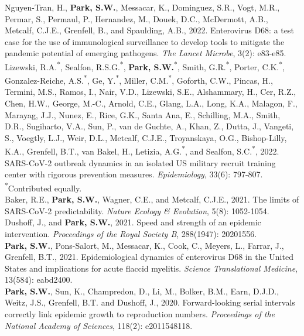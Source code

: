 \documentclass[11pt]{article} %
\begin{document}
 Nguyen-Tran, H., \textbf{Park, S.W.}, Messacar, K., Dominguez, S.R., Vogt, M.R., Permar, S., Permaul, P., Hernandez, M., Douek, D.C., McDermott, A.B., Metcalf, C.J.E., Grenfell, B., and Spaulding, A.B., 2022. Enterovirus D68: a test case for the use of immunological surveillance to develop tools to mitigate the pandemic potential of emerging pathogens. \textit{The Lancet Microbe}, 3(2): e83-e85.\\

 Lizewski, R.A.\textsuperscript{*}, Sealfon, R.S.G.\textsuperscript{*}, \textbf{Park, S.W.}\textsuperscript{*}, Smith, G.R.\textsuperscript{*}, Porter, C.K.\textsuperscript{*}, Gonzalez-Reiche, A.S.\textsuperscript{*}, Ge, Y.\textsuperscript{*}, Miller, C.M.\textsuperscript{*}, Goforth, C.W., Pincas, H., Termini, M.S., Ramos, I., Nair, V.D., Lizewski, S.E., Alshammary, H., Cer, R.Z., Chen, H.W., George, M.-C., Arnold, C.E., Glang, L.A., Long, K.A., Malagon, F., Marayag, J.J., Nunez, E., Rice, G.K., Santa Ana, E., Schilling, M.A., Smith, D.R., Sugiharto, V.A., Sun, P., van de Guchte, A., Khan, Z., Dutta, J., Vangeti, S., Voegtly, L.J., Weir, D.L., Metcalf, C.J.E., Troyanskaya, O.G., Bishop-Lilly, K.A., Grenfell, B.T., van Bakel, H., Letizia, A.G.\textsuperscript{*}, and Sealfon, S.C.\textsuperscript{*}, 2022. SARS-CoV-2 outbreak dynamics in an isolated US military recruit training center with rigorous prevention measures. \textit{Epidemiology}, 33(6): 797-807.\\
\textsuperscript{*}Contributed equally.\\

 Baker, R.E., \textbf{Park, S.W.}, Wagner, C.E., and Metcalf, C.J.E., 2021. The limits of SARS-CoV-2 predictability. \textit{Nature Ecology \& Evolution}, 5(8): 1052-1054.\\

 Dushoff, J., and \textbf{Park, S.W.}, 2021. Speed and strength of an epidemic intervention. \textit{Proceedings of the Royal Society B}, 288(1947): 20201556.\\

 \textbf{Park, S.W.}, Pons-Salort, M., Messacar, K., Cook, C., Meyers, L., Farrar, J., Grenfell, B.T., 2021. Epidemiological dynamics of enterovirus D68 in the United States and implications for acute flaccid myelitis. \textit{Science Translational Medicine}, 13(584): eabd2400.\\

 \textbf{Park, S.W.}, Sun, K., Champredon, D., Li, M., Bolker, B.M., Earn, D.J.D., Weitz, J.S., Grenfell, B.T. and Dushoff, J., 2020. Forward-looking serial intervals correctly link epidemic growth to reproduction numbers. \textit{Proceedings of the National Academy of Sciences}, 118(2): e2011548118.\\
\end{document}

